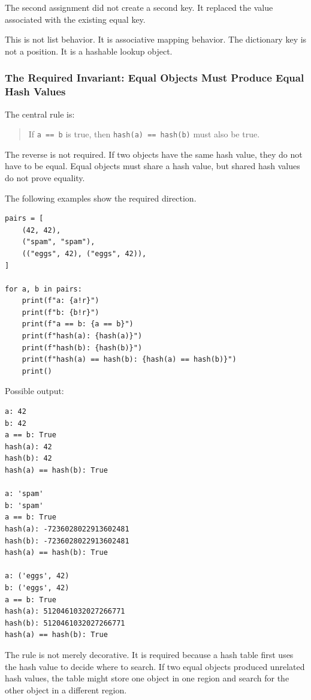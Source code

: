 The second assignment did not create a second key. It replaced the value associated with the existing equal key.

This is not list behavior. It is associative mapping behavior. The dictionary key is not a position. It is a hashable lookup object.

\subsubsection{The Required Invariant: Equal Objects Must Produce Equal Hash Values}

The central rule is:

\begin{quote}
If \texttt{a == b} is true, then \texttt{hash(a) == hash(b)} must also be true.
\end{quote}

The reverse is not required. If two objects have the same hash value, they do not have to be equal. Equal objects must share a hash value, but shared hash values do not prove equality.

The following examples show the required direction.

\begin{verbatim}
pairs = [
    (42, 42),
    ("spam", "spam"),
    (("eggs", 42), ("eggs", 42)),
]

for a, b in pairs:
    print(f"a: {a!r}")
    print(f"b: {b!r}")
    print(f"a == b: {a == b}")
    print(f"hash(a): {hash(a)}")
    print(f"hash(b): {hash(b)}")
    print(f"hash(a) == hash(b): {hash(a) == hash(b)}")
    print()
\end{verbatim}

Possible output:

\begin{verbatim}
a: 42
b: 42
a == b: True
hash(a): 42
hash(b): 42
hash(a) == hash(b): True

a: 'spam'
b: 'spam'
a == b: True
hash(a): -7236028022913602481
hash(b): -7236028022913602481
hash(a) == hash(b): True

a: ('eggs', 42)
b: ('eggs', 42)
a == b: True
hash(a): 5120461032027266771
hash(b): 5120461032027266771
hash(a) == hash(b): True
\end{verbatim}

The rule is not merely decorative. It is required because a hash table first uses the hash value to decide where to search. If two equal objects produced unrelated hash values, the table might store one object in one region and search for the other object in a different region.

